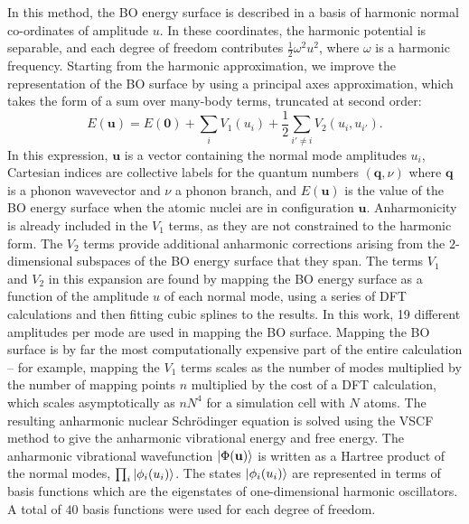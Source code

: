 \documentclass[aps,showpacs,prb,reprint,superscriptaddress,longbibliography]{revtex4-1}
\begin{document}
In this method, the BO energy surface is described in a basis of
harmonic normal co-ordinates of amplitude $u$. In these coordinates,
the harmonic potential is separable, and each degree of freedom
contributes $\frac{1}{2}\omega^2u^2$, where $\omega$ is a harmonic
frequency. Starting from the harmonic approximation, we improve the
representation of the BO surface by using a principal axes
approximation,\cite{jung_vibrational_1996} which takes the form of a
sum over many-body terms, truncated at second order:
\begin{equation} 
  E(\mathbf{u})=E(\mathbf{0})+\sum_i V_1(u_i) + \frac{1}{2} \sum_{i'\neq i} V_2(u_i,u_{i'}).
\end{equation} 
In this expression, $\mathbf{u}$ is a vector containing the normal
mode amplitudes $u_i$, Cartesian indices are collective labels for the
quantum numbers $(\mathbf{q},\nu)$ where $\mathbf{q}$ is a phonon
wavevector and $\nu$ a phonon branch, and $E(\mathbf{u})$ is the value
of the BO energy surface when the atomic nuclei are in configuration
$\mathbf{u}$.  Anharmonicity is already included in the $V_1$ terms,
as they are not constrained to the harmonic form. The $V_2$ terms
provide additional anharmonic corrections arising from the
$2$-dimensional subspaces of the BO energy surface that they span. The
terms $V_1$ and $ V_2$ in this expansion are found by mapping the BO
energy surface as a function of the amplitude $u$ of each normal mode,
using a series of DFT calculations and then fitting cubic splines to
the results.  In this work, 19 different amplitudes per mode are used
in mapping the BO surface. Mapping the BO surface is by far the most
computationally expensive part of the entire calculation -- for
example, mapping the $V_1$ terms scales as the number of modes
multiplied by the number of mapping points $n$ multiplied by the cost
of a DFT calculation, which scales asymptotically as $nN^4$ for a
simulation cell with $N$ atoms.  The resulting anharmonic nuclear
Schr\"{o}dinger equation is solved using the VSCF method to give the
anharmonic vibrational energy and free energy.  The anharmonic
vibrational wavefunction $\ket{\Phi(\mathbf{u})}$ is written as a
Hartree product of the normal modes, $\prod_i \ket{\phi_i (u_i)}$. The
states $\ket{\phi_i (u_i)}$ are represented in terms of basis
functions which are the eigenstates of one-dimensional harmonic
oscillators. A total of $40$ basis functions were used for each degree
of freedom.
\end{document}
